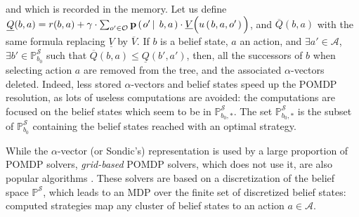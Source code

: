 and which is recorded in the memory. 
Let us define $\underline{Q}(b,a) = r(b,a) + \gamma \cdot \sum_{o' \in \mathcal{O}} \textbf{p} \left( \left.  o' \, \right| \left. \, b,a  \right. \right) \cdot \underline{V}\Big( u \left( \left.  b,a,o'  \right. \right) \Big)$,
and $\overline{Q}(b,a)$ with the same formula replacing  $\underline{V}$ by $ \overline{V}$.
If $b$ is a belief state, $a$ an action, and 
$\exists a' \in \mathcal{A}$, $\exists b' \in \mathbb{P}^{\mathcal{S}}_{b_0}$ 
such that $\overline{Q}(b,a) \leqslant \underline{Q}(b',a')$,
then, all the successors of $b$ when selecting action $a$ are
removed from the tree, and the associated $\alpha$-vectors deleted.
Indeed, less stored $\alpha$-vectors and belief states speed up the POMDP resolution,
as lots of useless computations are avoided:
the computations are focused on the belief states 
which seem to be in $\mathbb{P}^{\mathcal{S}}_{b_0,*}$.
The set $\mathbb{P}^{\mathcal{S}}_{b_0,*}$ is %
the subset of $\mathbb{P}^{\mathcal{S}}_{b_0}$
containing the belief states reached 
with an optimal strategy.

While the $\alpha$-vector (or Sondic's) representation is used by a large proportion
of POMDP solvers, \textit{grid-based} POMDP solvers, which does not use it, 
are also popular algorithms \cite{bonet:icml02,Lovejoy91,Brafman97aheuristic,Bonet_newgrid-based}.
These solvers are based on a discretization of the belief space $\mathbb{P}^{\mathcal{S}}$,
which leads to an MDP over the finite set of discretized belief states: 
computed strategies map any cluster of belief states to an action $a \in \mathcal{A}$.

